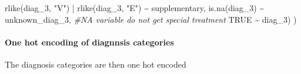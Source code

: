 \documentclass[
]{article}
\newenvironment{Shaded}{\begin{snugshade}}{\end{snugshade}}
\newcommand{\CommentTok}[1]{\textcolor[rgb]{0.56,0.35,0.01}{\textit{#1}}}
\newcommand{\ConstantTok}[1]{\textcolor[rgb]{0.00,0.00,0.00}{#1}}
\newcommand{\FunctionTok}[1]{\textcolor[rgb]{0.00,0.00,0.00}{#1}}
\newcommand{\NormalTok}[1]{#1}
\newcommand{\SpecialCharTok}[1]{\textcolor[rgb]{0.00,0.00,0.00}{#1}}
\newcommand{\StringTok}[1]{\textcolor[rgb]{0.31,0.60,0.02}{#1}}
\begin{document}
\begin{Shaded}
\begin{Highlighting}[]
      \FunctionTok{rlike}\NormalTok{(diag\_3, }\StringTok{"V"}\NormalTok{) }\SpecialCharTok{|} \FunctionTok{rlike}\NormalTok{(diag\_3, }\StringTok{"E"}\NormalTok{) }\SpecialCharTok{\textasciitilde{}} \StringTok{\textquotesingle{}supplementary\textquotesingle{}}\NormalTok{,}
      \FunctionTok{is.na}\NormalTok{(diag\_3) }\SpecialCharTok{\textasciitilde{}} \StringTok{\textquotesingle{}unknown\_diag\_3\textquotesingle{}}\NormalTok{, }\CommentTok{\#NA variable do not get special treatment}
      \ConstantTok{TRUE} \SpecialCharTok{\textasciitilde{}}\NormalTok{ diag\_3)}
\NormalTok{  )}
\end{Highlighting}
\end{Shaded}

\hypertarget{one-hot-encoding-of-diagnnsis-categories}{%
\paragraph{One hot encoding of diagnnsis
categories}\label{one-hot-encoding-of-diagnnsis-categories}}

The diagnosis categories are then one hot encoded
\end{document}
